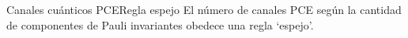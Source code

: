 \documentclass[xcolor=dvipsnames,presentation]{beamer}%
\begin{document}
\begin{frame}{Canales cuánticos PCE}{Regla espejo}
El número de canales PCE según la cantidad de componentes 
de Pauli invariantes obedece una regla `espejo'.

\vfill

\begin{table}[]
\centering
%

\end{table}
\end{frame}
\end{document}
